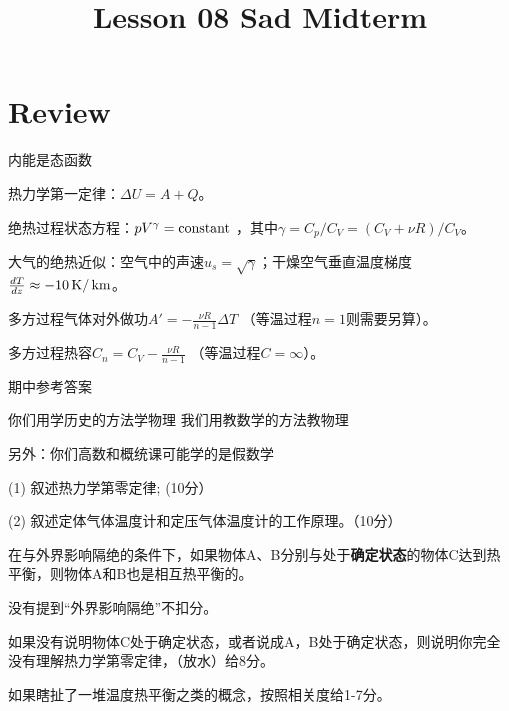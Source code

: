 \documentclass[CJK]{beamer}
\title{Lesson 08 Sad Midterm}
\author{}
\date{}
\begin{document}

\section{Review}

\begin{frame}
\bch
\bitem
\item{内能是态函数}
\item{热力学第一定律：$\Delta U = A + Q$。}
\item{绝热过程状态方程：$pV^\gamma = \mathrm{constant}$ ，其中$\gamma = C_p/C_V = (C_V + \nu R)/C_V$。}
\item{大气的绝热近似：空气中的声速$u_s =\sqrt{\gamma}$；干燥空气垂直温度梯度$\frac{dT}{dz} \approx -10 \,\mathrm{K}/\,\mathrm{km}$。}
\item{多方过程气体对外做功$A' = -\frac{\nu R}{n-1}\Delta T$ （等温过程$n=1$则需要另算）。}
\item{多方过程热容$C_n =C_V -\frac{\nu R}{n-1}$ （等温过程$C = \infty$）。}
\eitem
\ech
\end{frame}


\begin{frame}
\bch
\bitem
\item{期中参考答案}
\eitem
\ech
\end{frame}


\begin{frame}
\bch
{}
\ech
\end{frame}


\begin{frame}
\bch
{}
你们用学历史的方法学物理
\emini
{}
\emini
{}
我们用教数学的方法教物理
\emini

\begin{center}
另外：你们高数和概统课可能学的是假数学
\end{center}
\ech
\end{frame}

\begin{frame}
\bch
{\blue 
\bitem
\item[(1)]{\blue 叙述热力学第零定律; (10分）}
\item[(2)]{\blue 叙述定体气体温度计和定压气体温度计的工作原理。（10分）}
\eitem
}
\ech
\end{frame}

\begin{frame}
\bch

{\darkgreen 
在与外界影响隔绝的条件下，如果物体A、B分别与处于{\bf 确定状态}的物体C达到热平衡，则物体A和B也是相互热平衡的。
}

{\small
\bitem
\item{没有提到“外界影响隔绝”不扣分。}
\item{如果没有说明物体C处于确定状态，或者说成A，B处于确定状态，则说明你完全没有理解热力学第零定律，（放水）给8分。}
\item{如果瞎扯了一堆温度热平衡之类的概念，按照相关度给1-7分。}
\eitem
}
\ech
\end{frame}
\end{document}
